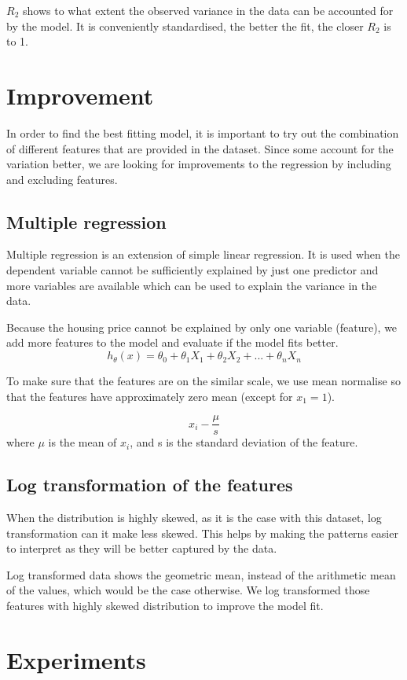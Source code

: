 \documentclass[11pt]{article}
\begin{document}
$R_{2}$ shows to what extent the observed variance in the data can be accounted for by the model. It is conveniently standardised, the better the fit, the closer $R_{2}$ is to 1. 

\section{Improvement}
In order to find the best fitting model, it is important to try out the combination of different features that are provided in the dataset. Since some account for the variation better, we are looking for improvements to the regression by including and excluding features.

\subsection{Multiple regression}
Multiple regression is an extension of simple linear regression. It is used when the dependent variable cannot be sufficiently explained by just one predictor and more variables are available which can be used to explain the variance in the data.


Because the housing price cannot be explained by only one variable (feature), we add more features to the model and evaluate if the model fits better. 
  \[h_{\theta}(x) = \theta_{0} + \theta_{1}X_{1} + \theta_{2}X_{2} + ...+\theta_{n}X_{n} \]

To make sure that the features are on the similar scale, we use mean normalise so that the features have approximately zero mean (except for $x_{1} = 1$).

\[x_{i} - \frac{\mu}{s}\]
where $\mu$ is the mean of $x_{i}$, and s is the standard deviation of the feature.

\subsection{Log transformation of the features}
When the distribution is highly skewed, as it is the case with this dataset, log transformation can it make less skewed. This helps by making the patterns easier to interpret as they will be better captured by the data. 

Log transformed data shows the geometric mean, instead of the arithmetic mean of the values, which would be the case otherwise.
We log transformed those features with highly skewed distribution to improve the model fit.


\section{Experiments}
\end{document}
